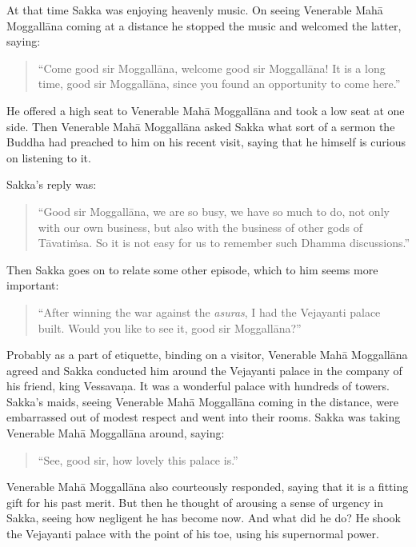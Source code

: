 At that time Sakka was enjoying heavenly music. On seeing Venerable Mahā Moggallāna coming at a distance he stopped the music and welcomed the latter, saying:

\begin{quote}
``Come good sir Moggallāna, welcome good sir Moggallāna! It is a long time, good sir Moggallāna, since you found an opportunity to come here.''
\end{quote}

\clearpage

He offered a high seat to Venerable Mahā Moggallāna and took a low seat at one side. Then Venerable Mahā Moggallāna asked Sakka what sort of a sermon the Buddha had preached to him on his recent visit, saying that he himself is curious on listening to it.

Sakka's reply was:

\begin{quote}
``Good sir Moggallāna, we are so busy, we have so much to do, not only with our own business, but also with the business of other gods of Tāvatiṁsa. So it is not easy for us to remember such Dhamma discussions.''
\end{quote}

Then Sakka goes on to relate some other episode, which to him seems more important:

\begin{quote}
``After winning the war against the \emph{asuras}, I had the Vejayanti palace built. Would you like to see it, good sir Moggallāna?''
\end{quote}

Probably as a part of etiquette, binding on a visitor, Venerable Mahā Moggallāna agreed and Sakka conducted him around the Vejayanti palace in the company of his friend, king Vessavaṇa. It was a wonderful palace with hundreds of towers. Sakka's maids, seeing Venerable Mahā Moggallāna coming in the distance, were embarrassed out of modest respect and went into their rooms. Sakka was taking Venerable Mahā Moggallāna around, saying:

\begin{quote}
``See, good sir, how lovely this palace is.''
\end{quote}

Venerable Mahā Moggallāna also courteously responded, saying that it is a fitting gift for his past merit. But then he thought of arousing a sense of urgency in Sakka, seeing how negligent he has become now. And what did he do? He shook the Vejayanti palace with the point of his toe, using his supernormal power.

